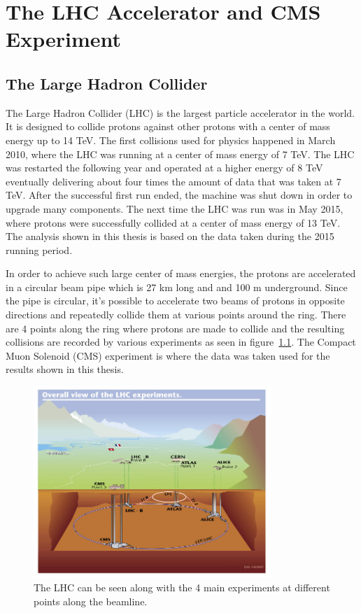 \chapter{The LHC Accelerator and CMS Experiment}
\label {ch:cms}

\section{The Large Hadron Collider}
The Large Hadron Collider (LHC) is the largest particle accelerator in the world.
It is designed to collide protons against other protons with a center of mass energy up to 14 TeV.
The first collisions used for physics happened in March 2010, where the LHC was running at a center of mass energy of 7 TeV.
The LHC was restarted the following year and operated at a higher energy of 8 TeV
eventually delivering about four times the amount of data that was taken at 7 TeV.
After the successful first run ended, the machine was shut down in order to upgrade many components.
The next time the LHC was run was in May 2015, where protons were successfully collided at a center of mass energy of 13 TeV.
The analysis shown in this thesis is based on the data taken during the 2015 running period.

In order to achieve such large center of mass energies,
the protons are accelerated in a circular beam pipe which is 27 km long and and 100 m underground.
Since the pipe is circular,
it's possible to accelerate two beams of protons in opposite directions and repeatedly collide them at various points around the ring.
There are 4 points along the ring where protons are made to collide and the resulting collisions are recorded by various experiments as seen in figure~\ref{fig:lhcunderground}.
The Compact Muon Solenoid (CMS) experiment is where the data was taken used for the results shown in this thesis.

\begin{figure}[!ht]
\begin{center}
\includegraphics[width=0.8\textwidth]{cms/figs/lhc-underground.jpeg}
\caption{ The LHC can be seen along with the 4 main experiments at different points along the beamline.
\label{fig:lhcunderground}
}
\end{center}
\end{figure}

